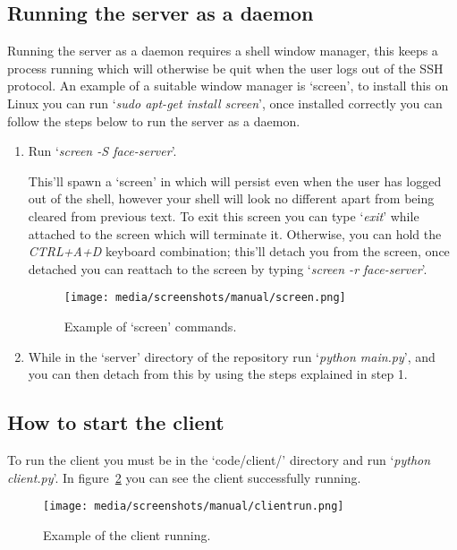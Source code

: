 \documentclass[12pt,a4paper]{report}
\begin{document}
    \subsection{Running the server as a daemon}
        Running the server as a daemon requires a shell window manager, this keeps a process running which will otherwise be quit when the user
        logs out of the SSH protocol. An example of a suitable window manager is `screen', to install this on Linux you can run 
        `\textit{sudo apt-get install screen}', once installed correctly you can follow the steps below to run the server as a daemon.
        \begin{enumerate}
            \item Run `\textit{screen -S face-server}'.

            This'll spawn a `screen' in which will persist even when the user has logged out of the shell, however your shell will look no different
            apart from being cleared from previous text. To exit this screen you can type `\textit{exit}' while attached to the screen which will terminate
            it. Otherwise, you can hold the \textit{CTRL+A+D} keyboard combination; this'll detach you from the screen, once detached you can reattach to 
            the screen by typing `\textit{screen -r face-server}'.

            \begin{figure}[H]
                \centering
                \caption{Example of `screen' commands.}
                \label{fig:screen}
                    \texttt{[image: media/screenshots/manual/screen.png]}
            \end{figure}

            \item While in the `server' directory of the repository run `\textit{python main.py}', and you can then detach from this by using the steps
            explained in step 1.

        \end{enumerate}

    \subsection{How to start the client}
        To run the client you must be in the `code/client/' directory and run `\textit{python client.py}'. In figure~\ref{fig:clientrun} you can 
        see the client successfully running.
        \begin{figure}[H]
            \centering
            \caption{Example of the client running.}
            \label{fig:clientrun}
                \texttt{[image: media/screenshots/manual/clientrun.png]}
        \end{figure}
\end{document}
